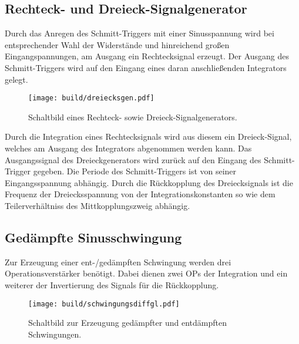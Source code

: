 \subsection{Rechteck- und Dreieck-Signalgenerator}%
\label{sub:signalgenerator}
Durch das Anregen des Schmitt-Triggers mit einer Sinusspannung wird bei
entsprechender Wahl der Widerstände und hinreichend großen Eingangspannungen, am Ausgang ein Rechtecksignal erzeugt.
Der Ausgang des Schmitt-Triggers wird auf den Eingang eines daran anschließenden
Integrators gelegt.
\begin{figure}[h]
		\centering
		\texttt{[image: build/dreiecksgen.pdf]}
		\caption{Schaltbild eines Rechteck- sowie Dreieck-Signalgenerators. \cite{anleitung}}
		\label{fig:}
\end{figure}
Durch die Integration eines Rechtecksignals wird aus diesem ein Dreieck-Signal,
welches am Ausgang des Integrators abgenommen werden kann.
Das Ausgangssignal des Dreieckgenerators wird zurück auf den Eingang des 
Schmitt-Trigger gegeben.
Die Periode des Schmitt-Triggers ist von seiner Eingangsspannung abhängig.
Durch die Rückkopplung des Dreiecksignals ist die Frequenz der Dreiecksspannung von der
Integrationskonstanten so wie dem Teilerverhältniss des Mittkopplungszweig abhängig.

\subsection{Gedämpfte Sinusschwingung}%
\label{sub:gedaempfte_sinusschwingung}
Zur Erzeugung einer ent-/gedämpften Schwingung werden drei Operationsverstärker
benötigt.
Dabei dienen zwei OPs der Integration und ein weiterer der Invertierung
des Signals für die Rückkopplung.
\begin{figure}[h]
		\centering
		\texttt{[image: build/schwingungsdiffgl.pdf]}
		\caption{Schaltbild zur Erzeugung gedämpfter und entdämpften Schwingungen. \cite{anleitung}}
		\label{fig:}
\end{figure}


